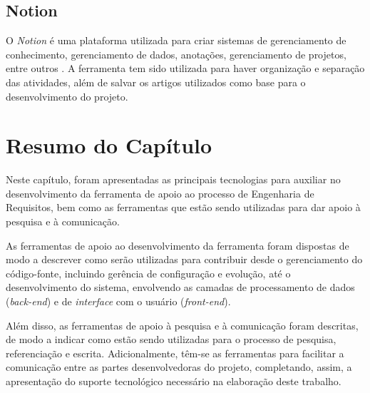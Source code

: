 \subsection{Notion}
O \textit{Notion} é uma plataforma utilizada para criar sistemas de gerenciamento de conhecimento, gerenciamento de dados, anotações, gerenciamento de projetos, entre outros \cite{notion}. A ferramenta tem sido utilizada para haver organização e separação das atividades, além de salvar os artigos utilizados como base para o desenvolvimento do projeto.

\section{Resumo do Capítulo}

Neste capítulo, foram apresentadas as principais tecnologias para auxiliar no desenvolvimento da ferramenta de apoio ao processo de Engenharia de Requisitos, bem como as ferramentas que estão sendo utilizadas para dar apoio à pesquisa e à comunicação.

As ferramentas de apoio ao desenvolvimento da ferramenta foram dispostas de modo a descrever como serão utilizadas para contribuir desde o gerenciamento do código-fonte, incluindo gerência de configuração e evolução, até o desenvolvimento do sistema, envolvendo as camadas de processamento de dados (\textit{back-end}) e de \textit{interface} com o usuário (\textit{front-end}).

Além disso, as ferramentas de apoio à pesquisa e à comunicação foram descritas, de modo a indicar como estão sendo utilizadas para o processo de pesquisa, referenciação e escrita. Adicionalmente, têm-se as ferramentas para facilitar a comunicação entre as partes desenvolvedoras do projeto, completando, assim, a apresentação do suporte tecnológico necessário na elaboração deste trabalho.